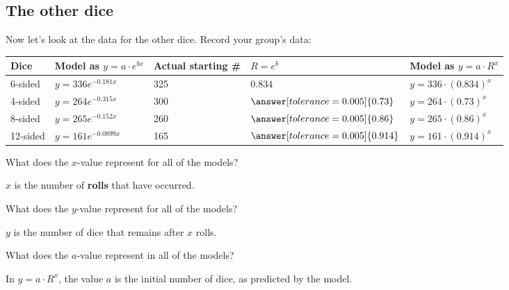\documentclass[12pt]{ximera}
\begin{document}
\subsection*{The other dice}

Now let's look at the data for the other dice. Record your group's data:

\begin{center}
\begin{tabular}{|l|l|l|l|l|}
\hline
Dice & Model as $y = a \cdot e^{bx}$ & Actual starting \# & $R = e^{b}$ & Model as $y = a \cdot R^{x}$ \\
\hline
6-sided & $y = 336 e^{-0.181x}$ & 325 & $0.834$ & $y = 336 \cdot (0.834)^{x}$ \\
\hline
4-sided & $y = 264 e^{-0.315x}$ & 300 & $\answer[tolerance=0.005]{0.73}$ & $y = 264 \cdot (0.73)^{x}$ \\
\hline
8-sided & $y = 265 e^{-0.152x}$ & 260 & $\answer[tolerance=0.005]{0.86}$ & $y = 265 \cdot (0.86)^{x}$ \\
\hline
12-sided & $y = 161 e^{-0.0899x}$ & 165 & $\answer[tolerance=0.005]{0.914}$ & $y = 161 \cdot (0.914)^{x}$ \\
\hline
\end{tabular}
\end{center}

\begin{problem}
What does the $x$-value represent for all of the models?
\begin{freeResponse}
\end{freeResponse}
\begin{solution}
$x$ is the number of \textbf{rolls} that have occurred.
\end{solution}
\end{problem}

\begin{problem}
What does the $y$-value represent for all of the models?
\begin{freeResponse}
\end{freeResponse}
\begin{solution}
$y$ is the number of dice that remains after $x$ rolls.
\end{solution}
\end{problem}

\begin{problem}
What does the $a$-value represent in all of the models?
\begin{freeResponse}
\end{freeResponse}
\begin{solution}
In $y = a \cdot R^{x}$, the value $a$ is the initial number of dice, as predicted by
the model.
\end{solution}
\end{problem}
\end{document}
